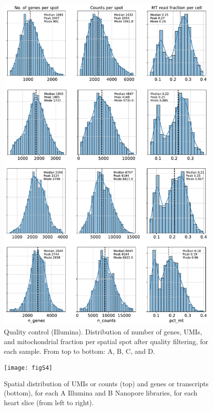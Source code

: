 \documentclass[utf8]{frontiers_suppmat} %
\begin{document}
\begin{figure}[htbp]
\begin{center}
\includegraphics[width=.75\textwidth]{figS3}%
\end{center}
\caption{Quality control (Illumina). Distribution of number of genes, UMIs, and mitochondrial fraction per spatial spot after quality filtering, for each sample. From top to bottom: A, B, C, and D.}\label{fig:S3}
\end{figure}


\begin{figure}[htbp]
\begin{center}
\texttt{[image: figS4]}%
\end{center}
\caption{Spatial distribution of UMIs or counts (top) and genes or transcripts (bottom), for each A Illumina and B Nanopore libraries, for each heart slice (from left to right).}\label{fig:S4}
\end{figure}
\end{document}
